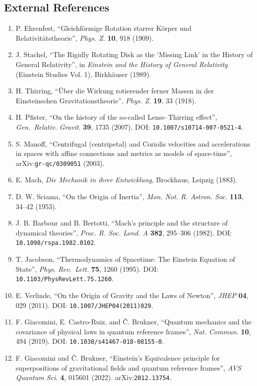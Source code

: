 \documentclass[
  a4paper,
]{article}
\providecommand{\tightlist}{%
  \setlength{\itemsep}{0pt}\setlength{\parskip}{0pt}}
\begin{document}
\subsection{External References}\label{external-references}

\begin{enumerate}
\def\labelenumi{\arabic{enumi}.}
\setcounter{enumi}{3}
\tightlist
\item
  P. Ehrenfest, ``Gleichförmige Rotation starrer Körper und
  Relativitätstheorie'', \emph{Phys. Z.} \textbf{10}, 918 (1909).
\item
  J. Stachel, ``The Rigidly Rotating Disk as the `Missing Link' in the
  History of General Relativity'', in \emph{Einstein and the History of
  General Relativity} (Einstein Studies Vol. 1), Birkhäuser (1989).
\item
  H. Thirring, ``Über die Wirkung rotierender ferner Massen in der
  Einsteinschen Gravitationstheorie'', \emph{Phys. Z.} \textbf{19}, 33
  (1918).
\item
  H. Pfister, ``On the history of the so-called Lense--Thirring
  effect'', \emph{Gen.~Relativ. Gravit.} \textbf{39}, 1735 (2007). DOI:
  \texttt{10.1007/s10714-007-0521-4}.
\item
  S. Manoff, ``Centrifugal (centripetal) and Coriolis velocities and
  accelerations in spaces with affine connections and metrics as models
  of space-time'', arXiv:\texttt{gr-qc/0309051} (2003).
\item
  E. Mach, \emph{Die Mechanik in ihrer Entwicklung}, Brockhaus, Leipzig
  (1883).
\item
  D. W. Sciama, ``On the Origin of Inertia'', \emph{Mon. Not. R. Astron.
  Soc.} \textbf{113}, 34--42 (1953).
\item
  J. B. Barbour and B. Bertotti, ``Mach's principle and the structure of
  dynamical theories'', \emph{Proc. R. Soc. Lond. A} \textbf{382},
  295--306 (1982). DOI: \texttt{10.1098/rspa.1982.0102}.
\item
  T. Jacobson, ``Thermodynamics of Spacetime: The Einstein Equation of
  State'', \emph{Phys. Rev.~Lett.} \textbf{75}, 1260 (1995). DOI:
  \texttt{10.1103/PhysRevLett.75.1260}.
\item
  E. Verlinde, ``On the Origin of Gravity and the Laws of Newton'',
  \emph{JHEP} \textbf{04}, 029 (2011). DOI:
  \texttt{10.1007/JHEP04(2011)029}.
\item
  F. Giacomini, E. Castro-Ruiz, and Č. Brukner, ``Quantum mechanics and
  the covariance of physical laws in quantum reference frames'',
  \emph{Nat. Commun.} \textbf{10}, 494 (2019). DOI:
  \texttt{10.1038/s41467-018-08155-0}.
\item
  F. Giacomini and Č. Brukner, ``Einstein's Equivalence principle for
  superpositions of gravitational fields and quantum reference frames'',
  \emph{AVS Quantum Sci.} \textbf{4}, 015601 (2022).
  arXiv:\texttt{2012.13754}.
\end{enumerate}
\end{document}
